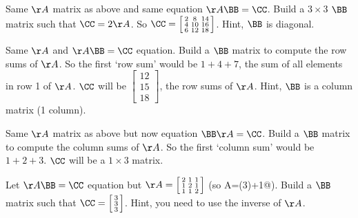 \begin{hwenumerate}
\item Same $\AA$ matrix as above and same equation $\AA \BB = \CC$.  Build a $3 \times 3$ $\BB$ matrix such that $\CC=2\AA$.  So $\CC=\left[ \begin{smallmatrix}2&8&14\\ 4&10&16\\ 6&12&18\end{smallmatrix}\right]$. Hint, $\BB$ is diagonal.
\item Same $\AA$ and $\AA \BB=\CC$ equation.  Build a $\BB$ matrix to compute the row sums of $\AA$.  So the first `row sum' would be $1+4+7$, the sum of all elements in row 1 of $\AA$.  $\CC$ will be $\left[ \begin{smallmatrix}12\\ 15\\ 18\end{smallmatrix}\right]$, the row sums of $\AA$. Hint, $\BB$ is a column matrix (1 column).
\item Same $\AA$ matrix as above but now equation $\BB \AA  = \CC$.  Build a $\BB$ matrix to compute the column sums of $\AA$.  So the first `column sum' would be $1+2+3$.  $\CC$ will be a $1 \times 3$ matrix.
\item Let $\AA \BB=\CC$ equation but $\AA=\left[ \begin{smallmatrix}2&1&1\\1&2&1\\1&1&2\end{smallmatrix}\right]$ (so A=\verb@diag(3)+1@).  Build a $\BB$ matrix such that $\CC=\left[ \begin{smallmatrix}3\\ 3\\ 3\end{smallmatrix}\right]$. Hint, you need to use the inverse of $\AA$.

\end{hwenumerate}





